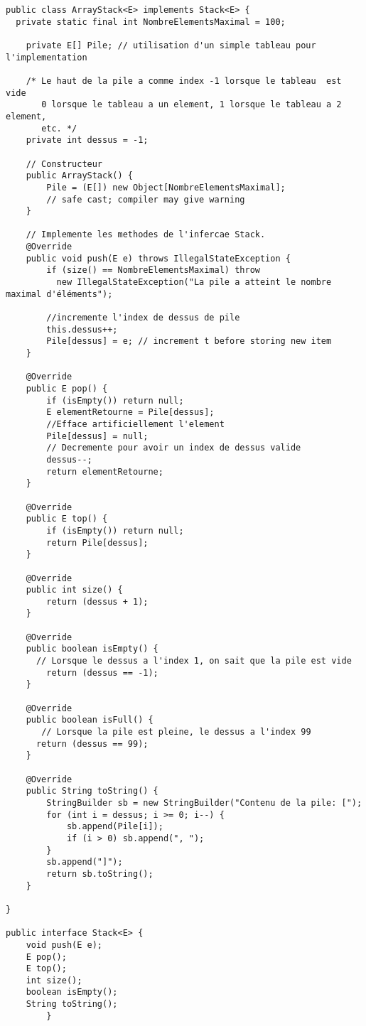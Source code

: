 \documentclass[10pt]{report}
\begin{document}
    \begin{lstlisting}[style=JavaDraculaWhite]
public class ArrayStack<E> implements Stack<E> {
  private static final int NombreElementsMaximal = 100;

    private E[] Pile; // utilisation d'un simple tableau pour l'implementation
    
    /* Le haut de la pile a comme index -1 lorsque le tableau  est vide 
       0 lorsque le tableau a un element, 1 lorsque le tableau a 2 element, 
       etc. */
    private int dessus = -1; 

    // Constructeur
    public ArrayStack() {
        Pile = (E[]) new Object[NombreElementsMaximal]; 
        // safe cast; compiler may give warning
    }

    // Implemente les methodes de l'infercae Stack.
    @Override
    public void push(E e) throws IllegalStateException {
        if (size() == NombreElementsMaximal) throw 
          new IllegalStateException("La pile a atteint le nombre maximal d'éléments");

        //incremente l'index de dessus de pile
        this.dessus++; 
        Pile[dessus] = e; // increment t before storing new item
    }

    @Override
    public E pop() {
        if (isEmpty()) return null;
        E elementRetourne = Pile[dessus];
        //Efface artificiellement l'element
        Pile[dessus] = null;
        // Decremente pour avoir un index de dessus valide
        dessus--;
        return elementRetourne;
    }

    @Override
    public E top() {
        if (isEmpty()) return null;
        return Pile[dessus];
    }

    @Override
    public int size() {
        return (dessus + 1);
    }

    @Override
    public boolean isEmpty() {
      // Lorsque le dessus a l'index 1, on sait que la pile est vide
        return (dessus == -1);
    }

    @Override 
    public boolean isFull() {
       // Lorsque la pile est pleine, le dessus a l'index 99
      return (dessus == 99);
    }

    @Override
    public String toString() {
        StringBuilder sb = new StringBuilder("Contenu de la pile: [");
        for (int i = dessus; i >= 0; i--) {
            sb.append(Pile[i]);
            if (i > 0) sb.append(", ");
        }
        sb.append("]");
        return sb.toString();
    }
  
}

public interface Stack<E> {
    void push(E e);
    E pop();
    E top();
    int size();
    boolean isEmpty();
    String toString();
        }
    \end{lstlisting}
\end{document}
